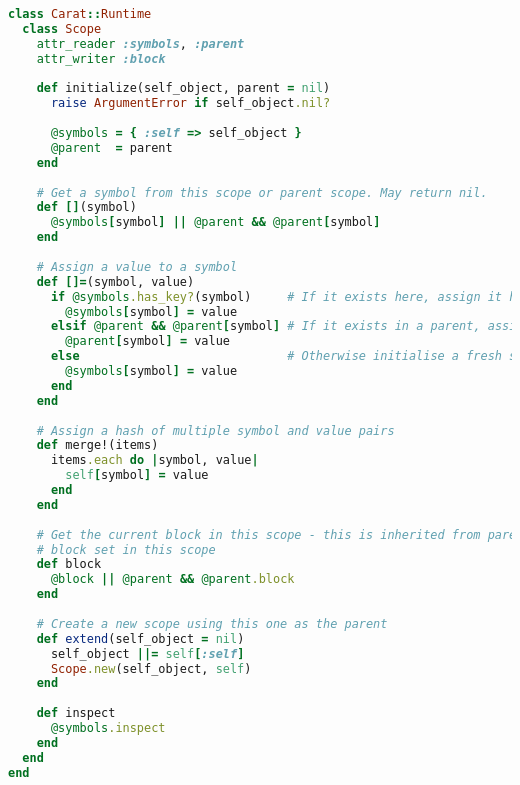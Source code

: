 \begin{lstlisting}[title={\small\ttfamily\bfseries runtime/scope.rb},language=Ruby]
class Carat::Runtime
  class Scope
    attr_reader :symbols, :parent
    attr_writer :block
    
    def initialize(self_object, parent = nil)
      raise ArgumentError if self_object.nil?
      
      @symbols = { :self => self_object }
      @parent  = parent
    end
    
    # Get a symbol from this scope or parent scope. May return nil.
    def [](symbol)
      @symbols[symbol] || @parent && @parent[symbol]
    end
    
    # Assign a value to a symbol
    def []=(symbol, value)
      if @symbols.has_key?(symbol)     # If it exists here, assign it here
        @symbols[symbol] = value
      elsif @parent && @parent[symbol] # If it exists in a parent, assign it there
        @parent[symbol] = value
      else                             # Otherwise initialise a fresh symbol here
        @symbols[symbol] = value
      end
    end
    
    # Assign a hash of multiple symbol and value pairs
    def merge!(items)
      items.each do |symbol, value|
        self[symbol] = value
      end
    end
    
    # Get the current block in this scope - this is inherited from parent scopes if there is no
    # block set in this scope
    def block
      @block || @parent && @parent.block
    end
    
    # Create a new scope using this one as the parent
    def extend(self_object = nil)
      self_object ||= self[:self]
      Scope.new(self_object, self)
    end
    
    def inspect
      @symbols.inspect
    end
  end
end

\end{lstlisting}

